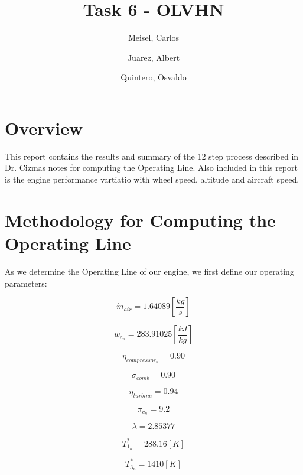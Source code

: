 \documentclass[12pt,english]{article}
\author{
    Meisel, Carlos \\
  \and
  Juarez, Albert\\
  \and
    Quintero, Osvaldo\\
}
\title{Task 6 - OLVHN}
\begin{document}
  \maketitle

\section{Overview}
This report contains the results and summary of the 12 step process described in Dr. Cizmas notes for computing the Operating Line. 
Also included in this report is the engine performance vartiatio with wheel speed, altitude and aircraft speed.

\section{Methodology for Computing the Operating Line}
As  we determine the Operating Line of our engine, we first define our 
operating parameters:

\begin{equation}
  \dot{m}_{air} = 1.64089 \left[\frac{kg}{s} \right]
\end{equation}

\begin{equation}
  w_{c_{n}} = 283.91025 \left[\frac{kJ}{kg}\right]
\end{equation}

\begin{equation}
  \eta_{compressor_{n}} = 0.90
\end{equation}

\begin{equation}
  \sigma_{comb} = 0.90
\end{equation}

\begin{equation}
  \eta_{turbine} = 0.94
\end{equation}

\begin{equation}
  \pi_{c_{n}} = 9.2
\end{equation}

\begin{equation}
  \lambda = 2.85377
\end{equation}

\begin{equation}
  T_{1_{n}}^{*} = 288.16 [K]
\end{equation}

\begin{equation}
  T_{3_{n}}^{*} = 1410 [K]
\end{equation}
\end{document}
